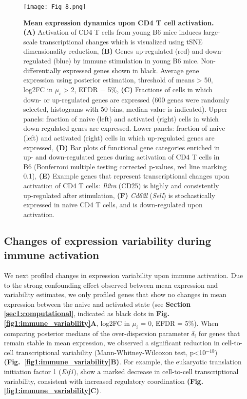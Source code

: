 \begin{figure}[!ht]
\centering
\texttt{[image: Fig\_8.png]}
\caption[Mean expression dynamics upon CD4\plus{} T cell activation]{\textbf{Mean expression dynamics upon CD4\plus{} T cell activation.}\\
\textbf{(A)} Activation of CD4\plus{} T cells from young B6 mice induces large-scale transcriptional changes which is visualized using tSNE dimensionality reduction, \textbf{(B)} Genes up-regulated (red) and down-regulated (blue) by immune stimulation in young B6 mice. Non-differentially expressed genes shown in black. Average gene expression using posterior estimation, threshold of means > 50, log2FC in $\mu_i$ > 2, EFDR = 5\%, \textbf{(C)} Fractions of cells in which down- or up-regulated genes are expressed (600 genes were randomly selected, histograms with 50 bins, median value is indicated). Upper panels: fraction of naive (left) and activated (right) cells in which down-regulated genes are expressed. Lower panels: fraction of naive (left) and activated (right) cells in which up-regulated genes are expressed, \textbf{(D)} Bar plots of functional gene categories enriched in up- and down-regulated genes during activation of CD4\plus{} T cells in B6 (Bonferroni multiple testing corrected p-values, red line marking 0.1), \textbf{(E)} Example genes that represent transcriptional changes upon activation of CD4\plus{} T cells: \textit{Il2ra} (CD25) is highly and consistently up-regulated after stimulation, \textbf{(F)} \textit{Cd62l} (\textit{Sell}) is stochastically expressed in naive CD4\plus{} T cells, and is down-regulated upon activation.
}
\label{fig1:immune_activation}
\end{figure}

\newpage

\subsection{Changes of expression variability during immune activation}

We next profiled changes in expression variability upon immune activation. Due to the strong confounding effect observed between mean expression and variability estimates, we only profiled genes that show no changes in mean expression between the naive and activated state (see \textbf{Section \ref{sec1:computational}}, indicated as black dots in \textbf{Fig. \ref{fig1:immune_variability}A}, log2FC in $\mu_i$ = 0, EFDR = 5\%). When comparing posterior medians of the over-dispersion parameter $\delta_i$ for genes that remain stable in mean expression, we observed a significant reduction in cell-to-cell transcriptional variability (Mann-Whitney-Wilcoxon test, p<10$^{-10}$) \textbf{(Fig.~\ref{fig1:immune_variability}B)}. For example, the eukaryotic translation initiation factor 1 (\textit{Eif1}), show a marked decrease in cell-to-cell transcriptional variability, consistent with increased regulatory coordination \textbf{(Fig. \ref{fig1:immune_variability}C)}.\\

